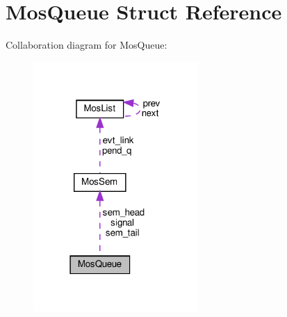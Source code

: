 \hypertarget{structMosQueue}{}\section{Mos\+Queue Struct Reference}
\label{structMosQueue}


Collaboration diagram for Mos\+Queue\+:\nopagebreak
\begin{figure}[H]
\begin{center}
\leavevmode
\includegraphics[width=178pt]{structMosQueue__coll__graph}
\end{center}
\end{figure}
